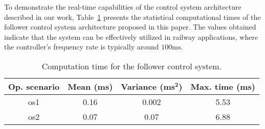 \documentclass[letterpaper, 10 pt, conference]{ieeeconf}
\theoremstyle{definition}
\theoremstyle{nopoint}
\newcommand{\tildeAdd}{~}
\begin{document}
\begin{comment}
			Infine all'istante di tempo $1700\unit{\second}$ è stato simulato il caso in cui i due treni perdano la comunicazione, questo è possibile vederlo in Figura\tildeAdd\ref{fig:os2_e} dove gli eventi di ricezione si susseguono a distanza temporale ampia provocando alla safety barrier di diventerà positiva anche in questo caso come nello scenario precedente a causa del blocco leader \gls{rlp} predictor, facendo scattare il controllore di emergenza $K_\mathrm{text}$. Difatti la brusca frenata è possibile vederla in Figura\tildeAdd\ref{fig:os2_f} dove una grande forza negativa è attuata dal control input da parte del controllore di emergenza $K_{\mathrm{E}^\mathrm{F}}$ che in Figura\tildeAdd\ref{fig:os2_d} risulta attivato.
			
			Una volta ristabilita la connessione con il leader, grazie all'arrivo del nuovo data packet il sistema di controllo ricalcolando la safety barrier verifica che in realtà il treno si trova in sicurezza e riattiva il controllore $K_{3}^\mathrm{F}$ per cercare lentamebte di recuperare lo spazio perso durante la frenata di emergenza.
			
			
		\end{comment}
				
		
		
		To demonstrate the real-time capabilities of the control system architecture described in our work, Table~\ref{tab:computationController} presents the statistical computational times of the follower control system architecture proposed in this paper. The values obtained indicate that the system can be effectively utilized in railway applications, where the controller's frequency rate is typically around $100\unit{\milli\second}$.
		
		
		\begin{table}[!h]
			\begin{center}
				\caption{Computation time for the follower control system.}
				\label{tab:computationController}
				\begin{tabular}{ |c|c|c|c| } 
					\hline
					\textbf{Op. scenario} & \textbf{Mean ($\mathbf{\unit{\milli\second}}$)} & \textbf{Variance ($\mathbf{\unit{\milli\second}^2}$)} & \textbf{Max. time ($\mathbf{\unit{\milli\second}}$)} \\
					\hline
					\gls{os}1	& 0.16 	& 0.002
					& 5.53 \\  
					\gls{os}2	& 0.07	& 0.07
					& 6.88 \\ 
					\hline
				\end{tabular}
			\end{center}
		\end{table}
	
\end{document}
